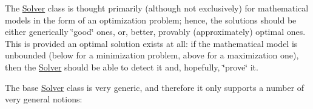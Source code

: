 The \mbox{\hyperlink{class_s_m_spp__di__unipi__it_1_1_solver}{Solver}} class is thought primarily (although not exclusively) for mathematical models in the form of an optimization problem; hence, the solutions should be either generically \char`\"{}good\char`\"{} ones, or, better, provably (approximately) optimal ones. This is provided an optimal solution exists at all\+: if the mathematical model is unbounded (below for a minimization problem, above for a maximization one), then the \mbox{\hyperlink{class_s_m_spp__di__unipi__it_1_1_solver}{Solver}} should be able to detect it and, hopefully, \char`\"{}prove\char`\"{} it.

The base \mbox{\hyperlink{class_s_m_spp__di__unipi__it_1_1_solver}{Solver}} class is very generic, and therefore it only supports a number of very general notions\+:



